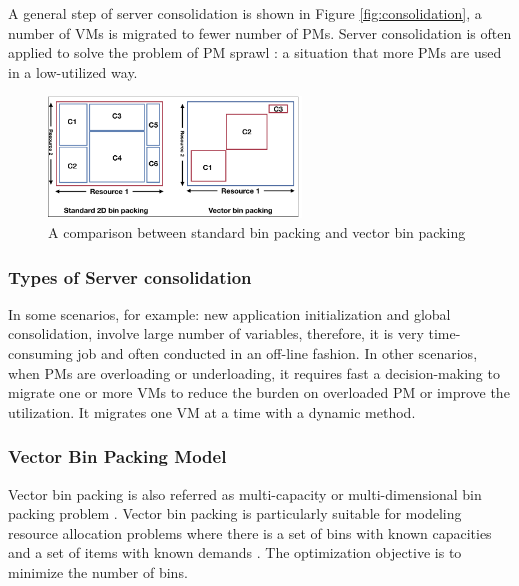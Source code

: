  A general step of server consolidation is shown in Figure \ref{fig:consolidation}, a number of VMs is migrated to fewer number of PMs. Server consolidation is often applied to solve the problem of PM sprawl \cite{Khanna:2006vq}: a situation that more PMs are used in a low-utilized way. 


\label{vector_bin_packing}

\begin{figure}
	\centering
	\includegraphics[width=0.6\textwidth]{pics/bin_packing_problem.png}
	\caption{A comparison between standard bin packing and vector bin packing}
	\label{fig:bin_packing_problem}
\end{figure}

\subsubsection{Types of Server consolidation}


 In some scenarios, for example: new application initialization and global consolidation, involve large number of variables, therefore, it is very time-consuming job and often conducted in an off-line fashion. In other scenarios, when PMs are overloading or underloading, it requires fast a decision-making to migrate one or more VMs to reduce the burden on overloaded PM or improve the utilization. It migrates one VM at a time with a dynamic method. 


\subsubsection{Vector Bin Packing Model}
\label{sec:vector_bin_packing}
 Vector bin packing is also referred as multi-capacity \cite{Leinberger:1999fs} or multi-dimensional bin packing problem \cite{Xiong:2014jq}. Vector bin packing is particularly suitable for modeling resource allocation problems where there is a set of bins with known capacities and a set of items with known demands \cite{Panigrahy:2011wk}. The optimization objective is to minimize the number of bins.


